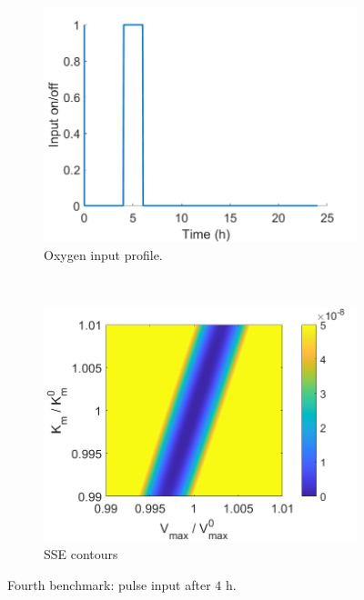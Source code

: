 \begin{figure}[H]
	\centering
	\begin{subfigure}[b]{0.45\textwidth}
		\includegraphics[width=\textwidth]{figure/paper 1/compare4input.png}
		\caption{Oxygen input profile.}
		\label{inputcompare4}
	\end{subfigure}
	~ %
	\begin{subfigure}[b]{0.45\textwidth}
		\includegraphics[width=\textwidth]{figure/paper 1/compare4.png}
		\caption{SSE contours}
		\label{SSEcompare4}
	\end{subfigure}
	\caption{Fourth benchmark: pulse input after $4 \text{ h}$.}
	\label{compare4}
\end{figure}
